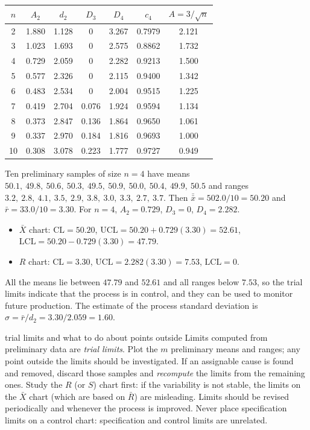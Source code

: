 \begin{center}
\small
\begin{tabular}{c|ccccc|c}
\toprule
$n$ & $A_2$ & $d_2$ & $D_3$ & $D_4$ & $c_4$ & $A=3/\sqrt n$\\
\midrule
2 & 1.880 & 1.128 & 0 & 3.267 & 0.7979 & 2.121\\
3 & 1.023 & 1.693 & 0 & 2.575 & 0.8862 & 1.732\\
4 & 0.729 & 2.059 & 0 & 2.282 & 0.9213 & 1.500\\
5 & 0.577 & 2.326 & 0 & 2.115 & 0.9400 & 1.342\\
6 & 0.483 & 2.534 & 0 & 2.004 & 0.9515 & 1.225\\
7 & 0.419 & 2.704 & 0.076 & 1.924 & 0.9594 & 1.134\\
8 & 0.373 & 2.847 & 0.136 & 1.864 & 0.9650 & 1.061\\
9 & 0.337 & 2.970 & 0.184 & 1.816 & 0.9693 & 1.000\\
10 & 0.308 & 3.078 & 0.223 & 1.777 & 0.9727 & 0.949\\
\bottomrule
\end{tabular}
\end{center}

\begin{example}\label{ex:xbarR}
Ten preliminary samples of size $n=4$ have means $50.1,\ 49.8,\ 50.6,\ 50.3,\ 49.5,\ 50.9,\ 50.0,\ 50.4,\ 49.9,\ 50.5$ and ranges $3.2,\ 2.8,\ 4.1,\ 3.5,\ 2.9,\ 3.8,\ 3.0,\ 3.3,\ 2.7,\ 3.7$. Then $\bar{\bar{x}}=502.0/10=50.20$ and $\bar{r}=33.0/10=3.30$. For $n=4$, $A_2=0.729$, $D_3=0$, $D_4=2.282$.
\begin{itemize}
  \item $\bar{X}$ chart: $\mathrm{CL}=50.20$, $\mathrm{UCL}=50.20+0.729(3.30)=52.61$, $\mathrm{LCL}=50.20-0.729(3.30)=47.79$.
  \item $R$ chart: $\mathrm{CL}=3.30$, $\mathrm{UCL}=2.282(3.30)=7.53$, $\mathrm{LCL}=0$.
\end{itemize}
All the means lie between $47.79$ and $52.61$ and all ranges below $7.53$, so the trial limits indicate that the process is in control, and they can be used to monitor future production. The estimate of the process standard deviation is $\hat\sigma=\bar{r}/d_2=3.30/2.059=1.60$.
\end{example}

\begin{pitfall}{trial limits and what to do about points outside}
Limits computed from preliminary data are \emph{trial limits}. Plot the $m$ preliminary means and ranges; any point outside the limits should be investigated. If an assignable cause is found and removed, discard those samples and \emph{recompute} the limits from the remaining ones. Study the $R$ (or $S$) chart first: if the variability is not stable, the limits on the $\bar{X}$ chart (which are based on $\bar{R}$) are misleading. Limits should be revised periodically and whenever the process is improved. Never place specification limits on a control chart: specification and control limits are unrelated.
\end{pitfall}

